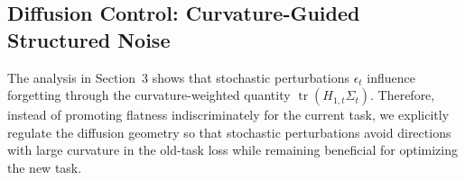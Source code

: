 \documentclass{article}
\begin{document}













\subsection{Diffusion Control: Curvature-Guided Structured Noise}

The analysis in Section~3 shows that stochastic perturbations $\epsilon_t$ influence forgetting through the curvature-weighted quantity $\operatorname{tr}(H_{1,t}\Sigma_t)$.
Therefore, instead of promoting flatness indiscriminately for the current task, we explicitly regulate the diffusion geometry so that stochastic perturbations avoid directions with large curvature in the old-task loss while remaining beneficial for optimizing the new task.
\end{document}
